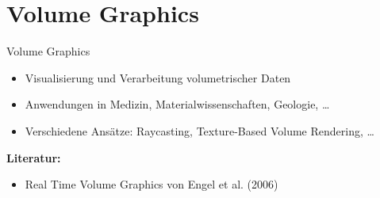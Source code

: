 \section{Volume Graphics}
\begin{frame}{Volume Graphics}
    \begin{itemize}
        \item Visualisierung und Verarbeitung volumetrischer Daten
        \item Anwendungen in Medizin, Materialwissenschaften, Geologie, \dots
        \item Verschiedene Ansätze: Raycasting, Texture-Based Volume Rendering, \dots
    \end{itemize}
    \vspace{1em}
    \textbf{Literatur:}
    \begin{itemize}
        \item \glqq Real Time Volume Graphics\grqq{} von Engel et al. (2006)
    \end{itemize}
\end{frame}